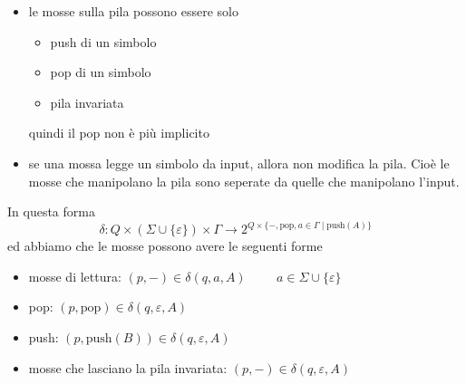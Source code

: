 \documentclass[12pt]{report}
\theoremstyle{definition}
\begin{document}
\begin{itemize}
\begin{center}
		\end{center}
 	\item le mosse sulla pila possono essere solo
 		\begin{itemize}
 			\item push di un simbolo
 			\item pop di un simbolo
		 	\item pila invariata
 		\end{itemize}
 		quindi il pop non è più implicito
 	\item se una mossa legge un simbolo da input, allora non modifica la pila. 
 		Cioè le mosse che manipolano la pila sono seperate da quelle che manipolano l'input.
\end{itemize}
In questa forma
$$ \delta : Q \times (\Sigma \cup \{\varepsilon\}) \times \Gamma \rightarrow 2^{Q \times \{-, \text{pop}, a \in \Gamma \mid \text{push}(A)\}} $$
ed abbiamo che le mosse possono avere le seguenti forme
\begin{itemize}
 	\item mosse di lettura: $ (p, -) \in \delta(q, a, A) \hspace{1cm} a \in \Sigma \cup \{\varepsilon\} $
 	\item pop: $(p, \text{pop}) \in \delta(q, \varepsilon , A) $
 	\item push: $(p, \text{push}(B)) \in \delta(q, \varepsilon , A) $
 	\item mosse che lasciano la pila invariata: $(p, -) \in \delta(q, \varepsilon , A) $
\end{itemize}
 
\end{document}
